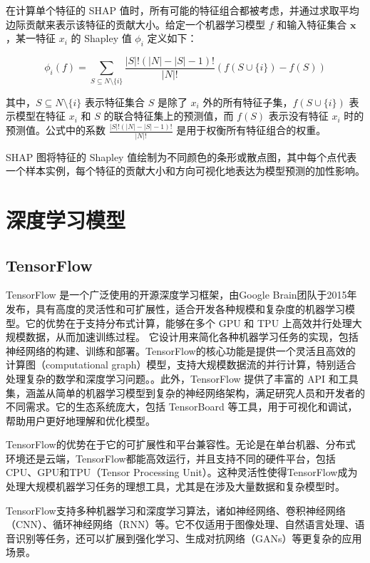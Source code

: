 \documentclass[AutoFakeBold]{LZUThesis-PgD&PhD}
\begin{document}
	在计算单个特征的 SHAP 值时，所有可能的特征组合都被考虑，并通过求取平均边际贡献来表示该特征的贡献大小。给定一个机器学习模型 \( f \) 和输入特征集合 \( \mathbf{x} \)，某一特征 \( x_i \) 的 Shapley 值 \( \phi_i \) 定义如下：
	
	\[
	\phi_i(f) = \sum_{S \subseteq N \setminus \{i\}} \frac{|S|! (|N| - |S| - 1)!}{|N|!} \left( f(S \cup \{i\}) - f(S) \right)
	\]
	
	其中，\( S \subseteq N \setminus \{i\} \) 表示特征集合 \( S \) 是除了 \( x_i \) 外的所有特征子集，\( f(S \cup \{i\}) \) 表示模型在特征 \( x_i \) 和 \( S \) 的联合特征集上的预测值，而 \( f(S) \) 表示没有特征 \( x_i \) 时的预测值。公式中的系数 \( \frac{|S|! (|N| - |S| - 1)!}{|N|!} \) 是用于权衡所有特征组合的权重。
	
	SHAP 图将特征的 Shapley 值绘制为不同颜色的条形或散点图，其中每个点代表一个样本实例，每个特征的贡献大小和方向可视化地表达为模型预测的加性影响。
	\section{深度学习模型}
	
	
	\subsection{TensorFlow}
	
	TensorFlow 是一个广泛使用的开源深度学习框架，由Google Brain团队于2015年发布，具有高度的灵活性和可扩展性，适合开发各种规模和复杂度的机器学习模型。它的优势在于支持分布式计算，能够在多个 GPU 和 TPU 上高效并行处理大规模数据，从而加速训练过程。
	它设计用来简化各种机器学习任务的实现，包括神经网络的构建、训练和部署。TensorFlow的核心功能是提供一个灵活且高效的计算图（computational graph）模型，支持大规模数据流的并行计算，特别适合处理复杂的数学和深度学习问题。。此外，TensorFlow 提供了丰富的 API 和工具集，涵盖从简单的机器学习模型到复杂的神经网络架构，满足研究人员和开发者的不同需求。它的生态系统庞大，包括 TensorBoard 等工具，用于可视化和调试，帮助用户更好地理解和优化模型。
	
	TensorFlow的优势在于它的可扩展性和平台兼容性。无论是在单台机器、分布式环境还是云端，TensorFlow都能高效运行，并且支持不同的硬件平台，包括CPU、GPU和TPU（Tensor Processing Unit）。这种灵活性使得TensorFlow成为处理大规模机器学习任务的理想工具，尤其是在涉及大量数据和复杂模型时。
	
	TensorFlow支持多种机器学习和深度学习算法，诸如神经网络、卷积神经网络（CNN）、循环神经网络（RNN）等。它不仅适用于图像处理、自然语言处理、语音识别等任务，还可以扩展到强化学习、生成对抗网络（GANs）等更复杂的应用场景。
	
\end{document}
